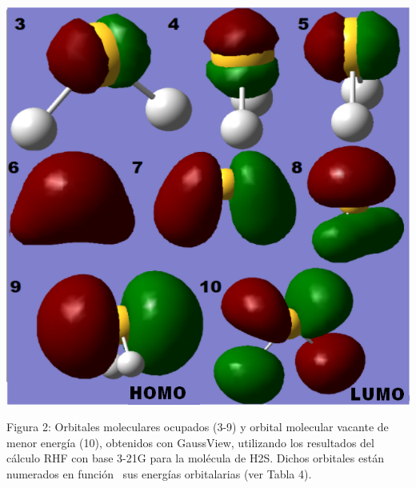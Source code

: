 \documentclass[]{article}
\begin{document}
{}

{\includegraphics{images/image5.png}}

{Figura 2}{: Orbitales moleculares ocupados (3-9) y orbital molecular
vacante de menor energía (10), obtenidos con }{GaussView}{, utilizando
los resultados del cálculo RHF con base 3-21G para la molécula de
H}{2}{S. Dichos orbitales están numerados en función ~sus energías
orbitalarias (ver Tabla }{4}{).}

{}

{}

{}

\protect\hypertarget{t.0c188b2daf5290b9405efa75cd6eeecd327549b7}{}{}\protect\hypertarget{t.3}{}{}
\end{document}
